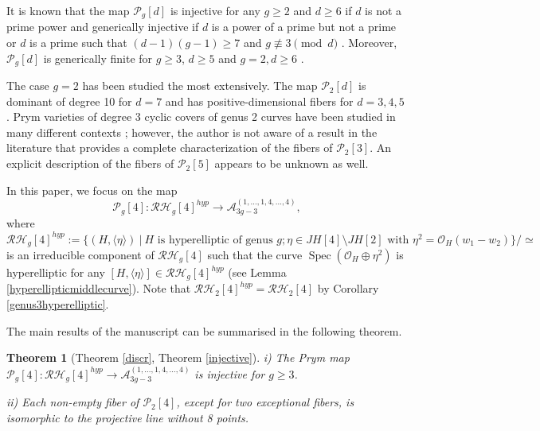 \documentclass{article}
\newtheorem{thm}{Theorem}[section]
\numberwithin{equation}{section}
\DeclareMathOperator{\Spec}{Spec}
\begin{document}
It is known that the map $\mathcal{P}_g[d]$ is injective for any $g \geq 2$ and $d \geq 6$ if $d$ is not a prime power and generically injective if $d$ is a power of a prime but not a prime \cite{borówka2025prymmapscycliccoverings} or $d$ is a prime such that $(d-1)(g-1) \geq 7$ and $g \not\equiv 3 \pmod d$ \cite{naranjo2024simplicityjacobiansautomorphisms}. Moreover, $\mathcal{P}_g[d]$ is generically finite for $g \geq 3$, $d \geq 5$ and $g=2, d\geq 6$ \cite{naranjo2024simplicityjacobiansautomorphisms, MR4093071}. 

The case $g=2$ has been studied the most extensively. The map $\mathcal{P}_2[d]$ is dominant of degree 10 for $d=7$ \cite{MR3519095} and has positive-dimensional fibers for $d=3,4,5$ \cite{MR3522345, borowka2025prymsmathbbz3timesmathbbz3coveringsgenus}. Prym varieties of degree 3 cyclic covers of genus 2 curves have been studied in many different contexts \cite{BLiso, BLEE, ries}; however, the author is not aware of a result in the literature that provides a complete characterization of the fibers of $\mathcal{P}_2[3]$. An explicit description of the fibers of $\mathcal{P}_2[5]$ appears to be unknown as well.  

In this paper, we focus on the map $$\mathcal{P}_g[4]: \mathcal{RH}_g[4]^{hyp} \to \mathcal{A}_{3g-3}^{(1,\ldots,1,4,\ldots, 4)},$$ where $$\mathcal{RH}_g[4]^{hyp} := \{(H, \langle\eta\rangle) \: | \: H \text{ is hyperelliptic of genus } g; \eta \in JH[4]\setminus JH[2] \text{ with } \eta^2 = \mathcal{O}_H(w_1 - w_2)\}/\simeq$$ is an irreducible component of $\mathcal{RH}_g[4]$ such that the curve $\Spec(\mathcal{O}_H \oplus \eta^2)$ is hyperelliptic for any $[H, \langle \eta \rangle] \in \mathcal{RH}_g[4]^{hyp}$ (see Lemma \ref{hyperellipticmiddlecurve}). Note that $\mathcal{RH}_2[4]^{hyp} = \mathcal{RH}_2[4]$ by Corollary \ref{genus3hyperelliptic}.

The main results of the manuscript can be summarised in the following theorem.

\begin{thm}[Theorem \ref{discr}, Theorem \ref{injective}]

i) The Prym map $\mathcal{P}_g[4]: \mathcal{RH}_g[4]^{hyp} \to\mathcal{A}_{3g-3}^{(1,\ldots,1,4,\ldots, 4)} $ is injective for $g \geq 3$.

ii) Each non-empty fiber of $\mathcal{P}_2[4]$, except for two exceptional fibers, is isomorphic to the projective line without 8 points.

    
\end{thm}
\end{document}
